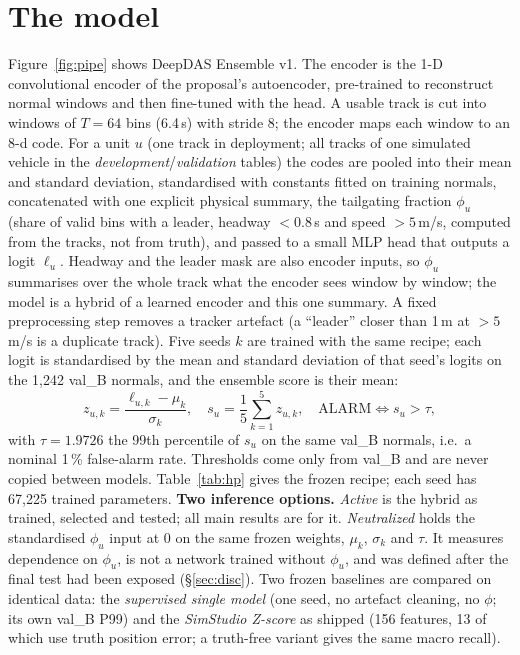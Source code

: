\documentclass[10pt,a4paper,twocolumn]{article}
\newcommand{\EDIV}{DeepDAS Ensemble v1}\newcommand{\dev}{\textit{development}}\newcommand{\val}{\textit{validation}}\newcommand{\ft}{\textit{final test}}
\begin{document}
\section{The model}
Figure~\ref{fig:pipe} shows \EDIV. The encoder is the 1-D convolutional encoder of the proposal's autoencoder, pre-trained to reconstruct normal windows and then fine-tuned with the head. A usable track is cut into windows of $T=64$ bins (6.4\,s) with stride 8; the encoder maps each window to an 8-d code. For a unit $u$ (one track in deployment; all tracks of one simulated vehicle in the \dev{}/\val{} tables) the codes are pooled into their mean and standard deviation, standardised with constants fitted on training normals, concatenated with one explicit physical summary, the tailgating fraction $\phi_u$ (share of valid bins with a leader, headway $<0.8$\,s and speed $>5$\,m/s, computed from the tracks, not from truth), and passed to a small MLP head that outputs a logit $\ell_u$. Headway and the leader mask are also encoder inputs, so $\phi_u$ summarises over the whole track what the encoder sees window by window; the model is a hybrid of a learned encoder and this one summary. A fixed preprocessing step removes a tracker artefact (a ``leader'' closer than 1\,m at $>5$\,m/s is a duplicate track). Five seeds $k$ are trained with the same recipe; each logit is standardised by the mean and standard deviation of that seed's logits on the 1{,}242 val\_B normals, and the ensemble score is their mean:
\begin{equation}
 z_{u,k}=\frac{\ell_{u,k}-\mu_k}{\sigma_k},\quad s_u=\frac{1}{5}\sum_{k=1}^{5} z_{u,k},\quad \text{ALARM}\iff s_u>\tau,
\end{equation}
with $\tau=1.9726$ the 99th percentile of $s_u$ on the same val\_B normals, i.e.\ a nominal 1\,\% false-alarm rate. Thresholds come only from val\_B and are never copied between models. Table~\ref{tab:hp} gives the frozen recipe; each seed has 67{,}225 trained parameters. \textbf{Two inference options.} \emph{Active} is the hybrid as trained, selected and tested; all main results are for it. \emph{Neutralized} holds the standardised $\phi_u$ input at 0 on the same frozen weights, $\mu_k$, $\sigma_k$ and $\tau$. It measures dependence on $\phi_u$, is not a network trained without $\phi_u$, and was defined after the final test had been exposed (\S\ref{sec:disc}). Two frozen baselines are compared on identical data: the \emph{supervised single model} (one seed, no artefact cleaning, no $\phi$; its own val\_B P99) and the \emph{SimStudio Z-score} as shipped (156 features, 13 of which use truth position error; a truth-free variant gives the same macro recall).
\end{document}
